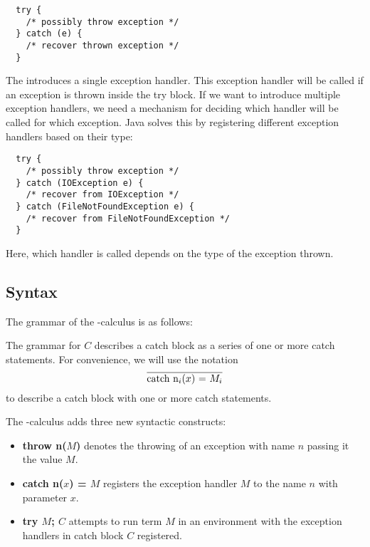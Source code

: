 \begin{Verbatim}
  try {
    /* possibly throw exception */
  } catch (e) {
    /* recover thrown exception */ 
  }
\end{Verbatim}

The  introduces a single exception handler.
This exception handler will be called if an exception is thrown inside the try block.
If we want to introduce multiple exception handlers,
we need a mechanism for deciding which handler will be called for which exception.
Java solves this by registering different exception handlers based on their type:

\begin{Verbatim}
  try {
    /* possibly throw exception */
  } catch (IOException e) {
    /* recover from IOException */  
  } catch (FileNotFoundException e) {
    /* recover from FileNotFoundException */ 
  }
\end{Verbatim}

Here, which handler is called depends on the type of the exception thrown.

\subsection{Syntax}

The grammar of the \ltry-calculus is as follows:

The grammar for $C$ describes a catch block as a series of one or more catch statements. 
For convenience, we will use the notation 
\[
  \overline{\text{catch n$_i$($x$) = $M_i$}}
\]
to describe a catch block with one or more catch statements. 

The \ltry-calculus adds three new syntactic constructs:
\begin{itemize}
\item \textbf{throw n($M$)} denotes the throwing of an exception with name $n$ passing it the value $M$.
\item \textbf{catch n($x$) = $M$} registers the exception handler $M$ to the name $n$ with parameter $x$.
\item \textbf{try $M$; $C$} attempts to run term $M$ in an environment with the exception handlers in catch block $C$ registered.
\end{itemize}

